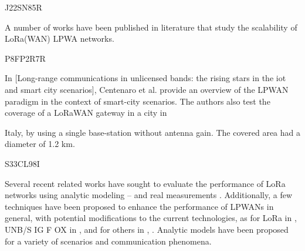 \cite{abeele_scalability_2017} J22SN85R

A number of works have been published in literature that study the scalability of LoRa(WAN) LPWA networks.






\cite{blenn_lorawan_2017} P8FP2R7R




In [Long-range communications in unlicensed bands:
	the rising stars in the iot and smart city scenarios],
	Centenaro et al.
provide an overview of the LPWAN paradigm in the context of smart-city scenarios.
The authors also test the coverage of a LoRaWAN gateway in a city in

Italy,
	by using a single base-station without antenna gain.
The covered area had a diameter of 1.2 km.




\cite{hoeller_analysis_2018} S33CL98I

Several recent related works have sought to evaluate the performance of LoRa networks using analytic modeling  \cite{georgiou_low_2017}–  \cite{bor_lora_2016}
\cite{gupta_modelling_2017}
\cite{pop_does_2017}
\cite{bankov_mathematical_2017}
and real measurements  \cite{petajajarvi_performance_2017}
\cite{petajajarvi_evaluation_2017}
\cite{wang_performance_2017}
\cite{neumann_indoor_2016}
\cite{angrisani_lora_2017}
\cite{jorke_urban_2017}
\cite{radcliffe_usability_2017}
\cite{rizzi_evaluation_2017}
\cite{oliveira_long_2017}.
Additionally,
	a few techniques have been proposed to enhance the performance of LPWANs in general,
	with potential modifications to the current technologies,
	as for LoRa in \cite{cuomo_explora_2017}
\cite{bor_lora_2017}
\cite{qin_resource_2017}
\cite{voigt_mitigating_2016},
	UNB/S IG F OX in \cite{mo_optimization_2016},
	and for others in \cite{song_evaluation_2017},
	\cite{magrin_performance_2017}.
Analytic models have been proposed for a variety of scenarios and communication phenomena.

